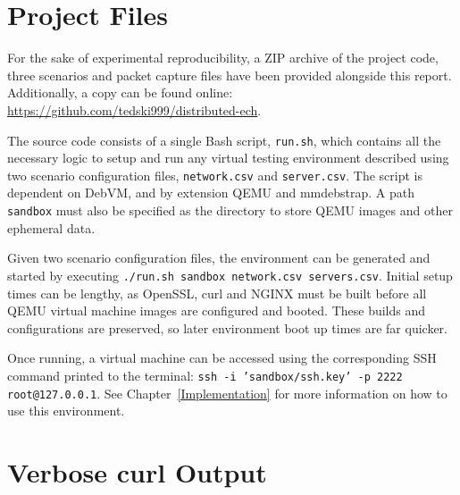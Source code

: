 \chapter{Project Files}\label{project-files}

For the sake of experimental reproducibility, a ZIP archive of the project code, three scenarios and packet capture files have been provided alongside this report. Additionally, a copy can be found online: \url{https://github.com/tedski999/distributed-ech}.

The source code consists of a single Bash script, \texttt{run.sh}, which contains all the necessary logic to setup and run any virtual testing environment described using two scenario configuration files, \texttt{network.csv} and \texttt{server.csv}. The script is dependent on DebVM, and by extension QEMU and mmdebstrap. A path \texttt{sandbox} must also be specified as the directory to store QEMU images and other ephemeral data.

Given two scenario configuration files, the environment can be generated and started by executing \texttt{./run.sh sandbox network.csv servers.csv}. Initial setup times can be lengthy, as OpenSSL, curl and NGINX must be built before all QEMU virtual machine images are configured and booted. These builds and configurations are preserved, so later environment boot up times are far quicker.

Once running, a virtual machine can be accessed using the corresponding SSH command printed to the terminal: \texttt{ssh -i 'sandbox/ssh.key' -p 2222 root@127.0.0.1}. See Chapter~\ref{Implementation} for more information on how to use this environment.

\chapter{Verbose curl Output}\label{verbose-curl-output}

\inputminted[tabsize=2,breaklines,breakanywhere]{text}{snippets/curl}
